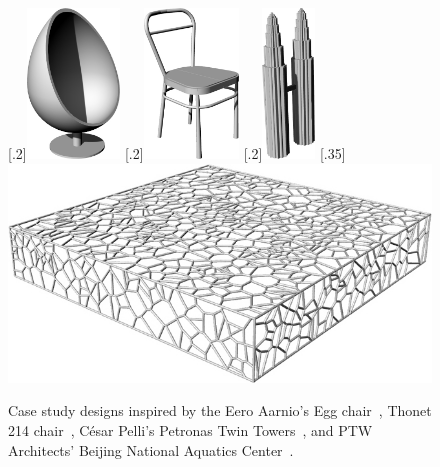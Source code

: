 \begin{figure}[htb]
    [.2\linewidth]{\includegraphics[height=4cm]{fig/case-study-egg-chair}}
  \hfill
    [.2\linewidth]{\includegraphics[height=4cm]{fig/case-study-thonet-214}}
  \hfill
    [.2\linewidth]{\includegraphics[height=4cm]{fig/case-study-petronas}}
  \hfill
    [.35\linewidth]{%
      \includegraphics[width=\linewidth]{fig/case-study-water-cube}}
  \caption[Case study design inspirations]{
    Case study designs inspired by the Eero Aarnio's Egg
    chair~, Thonet 214
    chair~,  César Pelli's Petronas
    Twin Towers~, and PTW Architects'
    Beijing National Aquatics
    Center~.}%
  \label{fig:eval.studies.designs}
\end{figure}

